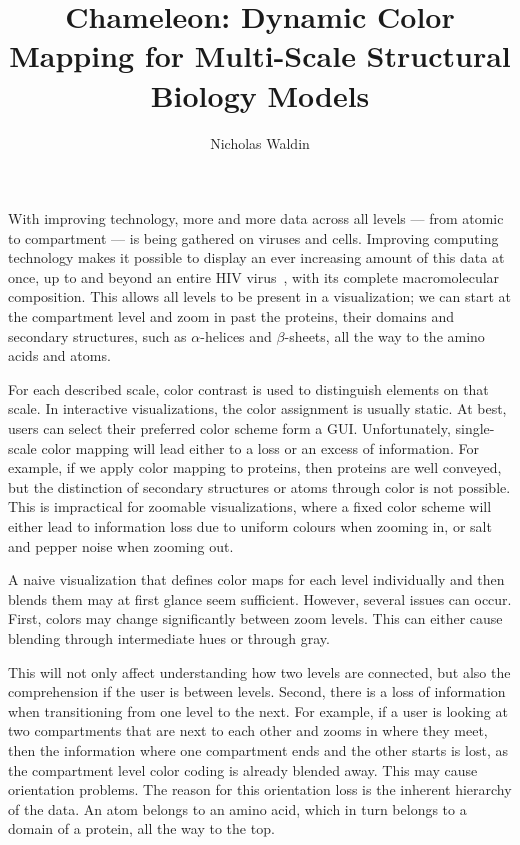 \documentclass[review,journal]{vgtc}         %
\title{Chameleon: Dynamic Color Mapping	for Multi-Scale Structural Biology Models}
\author{Nicholas Waldin}
\begin{document}

\label{introduction}
\maketitle

With improving technology, more and more data across all levels --- from atomic to compartment --- is being gathered on viruses and cells. 
Improving computing technology makes it possible to display an ever increasing amount of this data at once, up to and beyond an entire HIV virus~\cite{muzic2015cellview}, with its complete macromolecular composition.
This allows all levels to be present in a visualization; we can start at the compartment level and zoom in past the proteins, their domains and secondary structures, such as $\alpha$-helices and $\beta$-sheets, all the way to the amino acids and atoms.

For each described scale, color contrast is used to distinguish elements on that scale. 
In interactive visualizations, the color assignment is usually static. 
At best, users can select their preferred color scheme form a GUI. 
Unfortunately, single-scale color mapping will lead either to a loss or an excess of information.
For example, if we apply color mapping to proteins, then proteins are well conveyed, but the distinction of secondary structures or atoms through color is not possible.
This is impractical for zoomable visualizations, where a fixed color scheme will either lead to information loss due to uniform colours when zooming in, or salt and pepper noise when zooming out.

A naive visualization that defines color maps for each level individually and then blends them may at first glance seem sufficient.
However, several issues can occur.
First, colors may change significantly between zoom levels.
This can either cause blending through intermediate hues or through gray.

This will not only affect understanding how two levels are connected, but also the comprehension if the user is between levels.
Second, there is a loss of information when transitioning from one level to the next. 
For example, if a user is looking at two compartments that are next to each other and zooms in where they meet, then the information where one compartment ends and the other starts is lost, as the compartment level color coding is already blended away. 
This may cause orientation problems.
The reason for this orientation loss is the inherent hierarchy of the data.
An atom belongs to an amino acid, which in turn belongs to a domain of a protein, all the way to the top.
\end{document}
